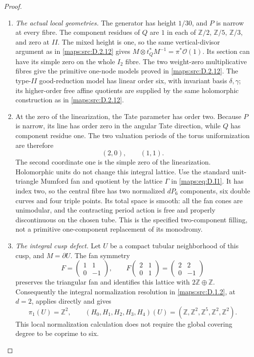 \begin{proof}
\begin{enumerate}[label=\arabic*.,leftmargin=*]
\item \emph{The actual local geometries.}
The generator has height $1/30$, and $P$ is narrow at
every fibre. The component residues of $Q$ are $1$ in
each of $\mathbb Z/2$, $\mathbb Z/5$, $\mathbb Z/3$,
and zero at $II$. The mixed height is one, so the same
vertical-divisor argument as in \ref{maps:src:D.2.12} gives
$M\otimes t_Q^*M^{-1}=\pi^*\mathcal O(1)$.
Its section can have its simple zero on the whole $I_2$
fibre. The two weight-zero multiplicative fibres give
the primitive one-node models proved in \ref{maps:src:D.2.12}.
The type-$II$ good-reduction model has linear order six,
with invariant basis $\delta,\gamma$; its higher-order
free affine quotients are supplied by the same holomorphic
construction as in \ref{maps:src:D.2.12}.

\item At the zero of the linearization, the Tate parameter has
order two. Because $P$ is narrow, its line has order zero
in the angular Tate direction, while $Q$ has component
residue one. The two valuation periods of the torus
uniformization are therefore
\[
                 (2,0),\qquad(1,1).
 \tag{D.I1}\label{maps:eq:D.I1}
\]
The second coordinate one is the simple zero of the
linearization. Holomorphic units do not change this
integral lattice. Use the standard unit-triangle Mumford
fan and quotient by the lattice $\Gamma$ in \eqref{maps:eq:D.I1}.
It has index two, so the central fibre has two normalized
$dP_6$ components, six double curves and four triple
points. Its total space is smooth: all the fan cones are
unimodular, and the contracting period action is free
and properly discontinuous on the chosen tube.
This is the specified two-component filling, not a
primitive one-component replacement of its monodromy.

\item \emph{The integral cusp defect.}
Let $U$ be a compact tubular neighborhood of this cusp,
and $M=\partial U$. The fan symmetry
\[
 F=\begin{pmatrix}1&1\\0&-1\end{pmatrix},\qquad
 F\begin{pmatrix}2&1\\0&1\end{pmatrix}
     =\begin{pmatrix}2&2\\0&-1\end{pmatrix}
\]
preserves the triangular fan and identifies this lattice
with $2\mathbb Z\oplus\mathbb Z$.
Consequently the integral normalization resolution in
\ref{maps:src:D.1.2}, at $d=2$, applies directly and gives
\[
 \pi_1(U)=\mathbb Z^2,\qquad
 (H_0,H_1,H_2,H_3,H_4)(U)
   =(\mathbb Z,\mathbb Z^2,\mathbb Z^5,\mathbb Z^2,\mathbb Z^2).
 \tag{D.I2}\label{maps:eq:D.I2}
\]
This local normalization calculation does not require the
global covering degree to be coprime to six.


\end{enumerate}
\end{proof}
